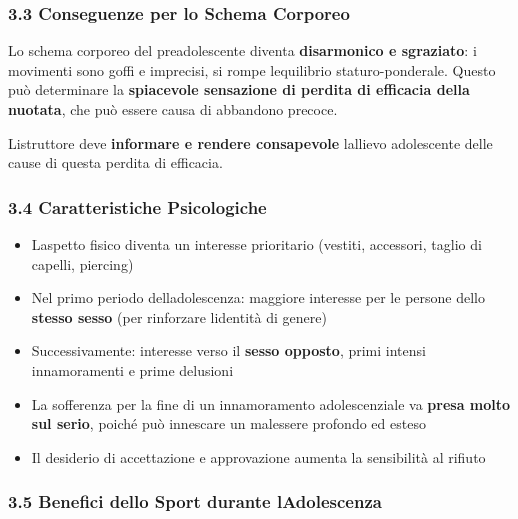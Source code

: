 \documentclass[a4paper,11pt]{article}
\providecommand{\tightlist}{%
  \setlength{\itemsep}{0pt}\setlength{\parskip}{0pt}}
\begin{document}
\subsubsection{3.3 Conseguenze per lo Schema
      Corporeo}\label{conseguenze-per-lo-schema-corporeo}

Lo schema corporeo del preadolescente diventa \textbf{disarmonico e
      sgraziato}: i movimenti sono goffi e imprecisi, si rompe
l\textquotesingle equilibrio staturo-ponderale. Questo può determinare
la \textbf{spiacevole sensazione di perdita di efficacia della nuotata},
che può essere causa di abbandono precoce.

L\textquotesingle istruttore deve \textbf{informare e rendere
      consapevole} l\textquotesingle allievo adolescente delle cause di questa
perdita di efficacia.

\subsubsection{3.4 Caratteristiche
      Psicologiche}\label{caratteristiche-psicologiche}

\begin{itemize}
      \tightlist
      \item
            L\textquotesingle aspetto fisico diventa un interesse prioritario
            (vestiti, accessori, taglio di capelli, piercing)
      \item
            Nel primo periodo dell\textquotesingle adolescenza: maggiore interesse
            per le persone dello \textbf{stesso sesso} (per rinforzare
            l\textquotesingle identità di genere)
      \item
            Successivamente: interesse verso il \textbf{sesso opposto}, primi
            intensi innamoramenti e prime delusioni
      \item
            La sofferenza per la fine di un innamoramento adolescenziale va
            \textbf{presa molto sul serio}, poiché può innescare un malessere
            profondo ed esteso
      \item
            Il desiderio di accettazione e approvazione aumenta la sensibilità al
            rifiuto
\end{itemize}

\subsubsection{3.5 Benefici dello Sport durante
      l\textquotesingle Adolescenza}\label{benefici-dello-sport-durante-ladolescenza}
\end{document}
